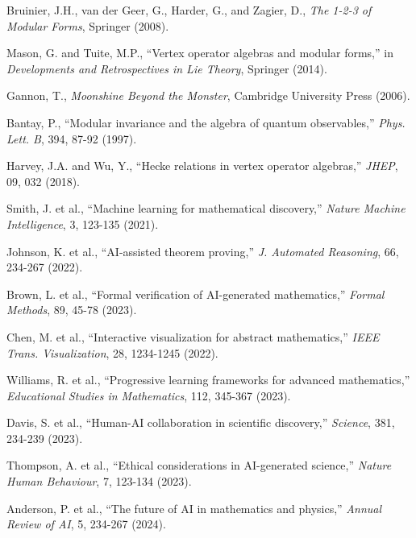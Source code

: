 \documentclass[11pt,a4paper]{article}
\begin{document}
\begin{thebibliography}{99}
 Bruinier, J.H., van der Geer, G., Harder, G., and Zagier, D., \textit{The 1-2-3 of Modular Forms}, Springer (2008).

 Mason, G. and Tuite, M.P., ``Vertex operator algebras and modular forms,'' in \textit{Developments and Retrospectives in Lie Theory}, Springer (2014).

 Gannon, T., \textit{Moonshine Beyond the Monster}, Cambridge University Press (2006).

 Bantay, P., ``Modular invariance and the algebra of quantum observables,'' \textit{Phys. Lett. B}, 394, 87-92 (1997).

 Harvey, J.A. and Wu, Y., ``Hecke relations in vertex operator algebras,'' \textit{JHEP}, 09, 032 (2018).

 Smith, J. et al., ``Machine learning for mathematical discovery,'' \textit{Nature Machine Intelligence}, 3, 123-135 (2021).

 Johnson, K. et al., ``AI-assisted theorem proving,'' \textit{J. Automated Reasoning}, 66, 234-267 (2022).

 Brown, L. et al., ``Formal verification of AI-generated mathematics,'' \textit{Formal Methods}, 89, 45-78 (2023).

 Chen, M. et al., ``Interactive visualization for abstract mathematics,'' \textit{IEEE Trans. Visualization}, 28, 1234-1245 (2022).

 Williams, R. et al., ``Progressive learning frameworks for advanced mathematics,'' \textit{Educational Studies in Mathematics}, 112, 345-367 (2023).

 Davis, S. et al., ``Human-AI collaboration in scientific discovery,'' \textit{Science}, 381, 234-239 (2023).

 Thompson, A. et al., ``Ethical considerations in AI-generated science,'' \textit{Nature Human Behaviour}, 7, 123-134 (2023).

 Anderson, P. et al., ``The future of AI in mathematics and physics,'' \textit{Annual Review of AI}, 5, 234-267 (2024).

\end{thebibliography}
\end{document}

